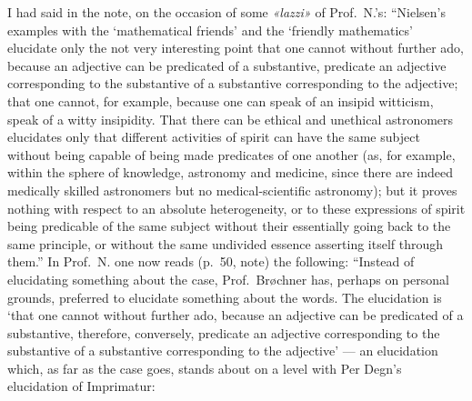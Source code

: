 \documentclass[12pt,a4paper]{book}
\begin{document}
I had said in the note, on the occasion of some \textit{«lazzi»} of Prof.\ N.'s:
``Nielsen's examples with the `mathematical friends' and the `friendly
mathematics' elucidate only the not very interesting point that one cannot
without further ado, because an adjective can be predicated of a substantive,
predicate an adjective corresponding to the substantive of a substantive
corresponding to the adjective; that one cannot, for example, because one can
speak of an insipid witticism, speak of a witty insipidity. That
there can be ethical and unethical astronomers elucidates only that different
activities of spirit can have the same subject without being capable of being
made predicates of one another (as, for example, within the sphere of knowledge,
astronomy and medicine, since there are indeed medically skilled astronomers but
no medical-scientific astronomy); but it proves nothing with respect to an
absolute heterogeneity, or to these expressions of spirit being predicable of the
same subject without their essentially going back to the same principle, or
without the same undivided essence asserting itself through them.'' In Prof.\ N.
one now reads (p.\ 50, note) the following: ``Instead of elucidating something
about the case, Prof.\ Brøchner has, perhaps on personal grounds, preferred to
elucidate something about the words.
The elucidation is `that one cannot without further ado, because an adjective can
be predicated of a substantive, therefore, conversely, predicate an adjective
corresponding to the substantive of a substantive corresponding to the
adjective' --- an elucidation which, as far as the case goes, stands about on a
level with Per Degn's elucidation of Imprimatur:
\end{document}
